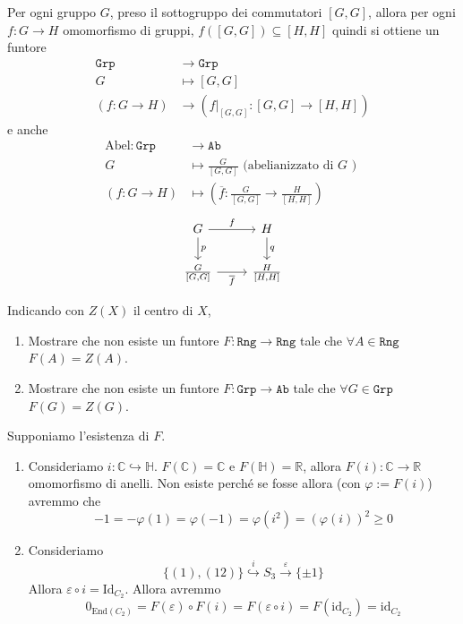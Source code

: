 \begin{example}{}
    Per ogni gruppo \(G\), preso il sottogruppo dei commutatori \([G, G]\),
    allora per ogni \(f : G \to H\) omomorfismo di gruppi, \(f{([G, G])} \subseteq [H, H] \) 
    quindi si ottiene un funtore
    \begin{align*}{}
        \mathtt{Grp} &\to \mathtt{Grp} \\
        G &\mapsto [G, G] \\
        {(f : G \to H)} &\to {(f |_{[G, G]} : [G, G] \to [H, H] )}
    \end{align*}
    e anche 
    \begin{align*}
        \mathrm{Abel} : \mathtt{Grp} &\to \mathtt{Ab} \\
        G &\mapsto \frac{G}{[G, G]} \text{ (abelianizzato di \(G\) ) } \\
        {(f : G \to H)} &\mapsto {\left(\overline{f} : \frac{G}{[G,G]} \to \frac{H}{[H,H]}\right)}
    \end{align*}
\[\begin{tikzcd}
	{G} & {H} \\
    {\frac{G}{[G,G]}} & {\frac{H}{[H,H]}}
	\arrow["f", from=1-1, to=1-2]
	\arrow["{p}", from=1-1, to=2-1]
	\arrow["{q}", from=1-2, to=2-2]
	\arrow["\overline{f}"', from=2-1, to=2-2]
\end{tikzcd}\]
\end{example}

\begin{eser}{}
    Indicando con \(Z{(X)}\) il centro di \(X\),

\begin{enumerate}[label = \alph*.]
    \item Mostrare che non esiste un funtore \(F : \mathtt{Rng} \to \mathtt{Rng}\) tale
    che \(\forall A \in \mathtt{Rng}\) \(F{(A)} = Z{(A)}\).
    \item Mostrare che non esiste un funtore \(F : \mathtt{Grp} \to \mathtt{Ab}\) tale
    che \(\forall G \in \mathtt{Grp}\) \(F{(G)} = Z{(G)}\).
\end{enumerate}
    \tcblower
    Supponiamo l'esistenza di \(F\).
\begin{enumerate}[label = \alph*.]
    \item Consideriamo \(i : \mathbb{C} \hookrightarrow \mathbb{H}\).
        \(F{(\mathbb{C})} = \mathbb{C} \) e \(F{(\mathbb{H})} = \mathbb{R}\),
        allora \(
        F{(i)} : \mathbb{C} \to \mathbb{R}\) omomorfismo di anelli. Non esiste
        perché se fosse allora (con \(\varphi := F{(i)}\)) avremmo che
        \[
          -1 = -\varphi {(1)} = \varphi {(-1)} = \varphi {(i^2)} = {(\varphi
          {(i)})}^2 \ge 0
        \]
    \item Consideriamo
        \[
          \{(1), (12)\} \overset{i}{\hookrightarrow } S_{3} \overset{\varepsilon}{\to } \{\pm 1\} 
        \]
        Allora \(\varepsilon \circ i = \mathrm{Id}_{C_{2}} \). Allora avremmo
        \[
          0_{\mathrm{End}{(C_{2})}}  = F{(\varepsilon)} \circ F{(i)} =
          F{(\varepsilon \circ i)} = F{(\mathrm{id}_{C_{2}})} = \mathrm{id}_{C_{2}}
        \]
\end{enumerate}

\end{eser}

